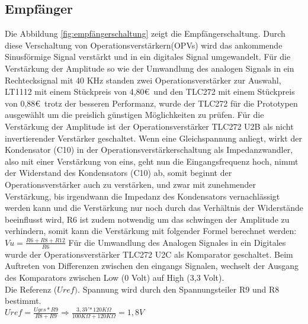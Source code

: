 \subsection{Empfänger}
Die Abbildung \ref{fig:empfängerschaltung} zeigt die Empfängerschaltung. Durch diese Verschaltung von Operationsverstärkern(OPVs) wird das ankommende Sinusförmige Signal verstärkt und in ein digitales Signal umgewandelt. 
Für die Verstärkung der Amplitude so wie der Umwandlung des analogen Signals in ein Rechtecksignal mit 40 KHz standen zwei Operationsverstärker zur Auswahl, LT1112 mit einem Stückpreis von 4,80\euro\ und den TLC272 mit einem Stückpreis von 0,88\euro\ trotz der besseren Performanz, wurde der TLC272 für die Prototypen ausgewählt um die preislich günstigen Möglichkeiten zu prüfen.
Für die Verstärkung der Amplitude ist der Operationsverstärker TLC272 U2B als nicht invertierender Verstärker geschaltet.
Wenn eine Gleichspannung anliegt, wirkt der Kondensator (C10) in der Operationsverstärkerschaltung als Impedanzwandler, also mit einer Verstärkung von eins, geht nun die Eingangsfrequenz hoch, nimmt der Widerstand des Kondensators (C10) ab, somit beginnt der Operationsverstärker auch zu verstärken, und zwar mit zunehmender Verstärkung, bis irgendwann die Impedanz des Kondensators vernachlässigt werden kann und die Verstärkung nur noch durch das Verhältnis der Widerstände beeinflusst wird, R6 ist zudem notwendig um das schwingen der Amplitude zu verhindern, somit kann die Verstärkung mit folgender Formel berechnet werden:
\onehalfspacing \\
\(\displaystyle Vu= \frac{ R6+R8+R12}{R6} \) 
\singlespacing
Für die Umwandlung des Analogen Signales in ein Digitales wurde der Operationsverstärker TLC272 U2C als Komparator geschaltet. Beim Auftreten von Differenzen zwischen den eingangs Signalen, wechselt der Ausgang des Komparators zwischen Low (0 Volt) auf High (3,3 Volt).\\ Die Referenz (\(\displaystyle Uref).\) Spannung wird durch den Spannungsteiler R9 und R8 bestimmt.
\onehalfspacing \\
\(\displaystyle Uref=\frac{Uges*R9}{R8+R9}\Rightarrow\frac{3,3V*120K\Omega}{100K\Omega+120K\Omega}=1,8V \)
\singlespacing

